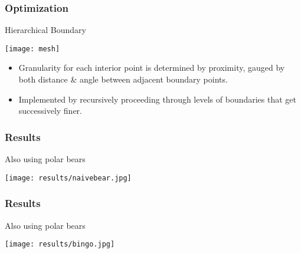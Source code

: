 \documentclass{beamer}
\theoremstyle{remark}
\begin{document}
\begin{frame}[t]
\frametitle{Optimization} 
\begin{block}{Hierarchical Boundary}
\pause
\begin{center}
\texttt{[image: mesh]}
\end{center}
\pause
\begin{itemize}
 \item \small{Granularity for each interior point is determined by proximity, gauged by both distance \& angle between adjacent boundary points.}
 \pause 
 \item \small{Implemented by recursively proceeding through levels of boundaries that get successively finer.}
\end{itemize}

\end{block}
\end{frame}


\begin{frame}[t]
 \frametitle{Results}
\begin{block}{Also using polar bears}
\pause
 \vspace{-2mm}
\begin{figure} 
\begin{center}
\end{center}
\end{figure}
\pause
\vspace{-20mm}
\begin{center}
 \texttt{[image: results/naivebear.jpg]}
\end{center}

\end{block}

\end{frame}

\begin{frame}[t]
 \frametitle{Results}
\begin{block}{Also using polar bears}
 \vspace{-2mm}
\begin{figure} 
\begin{center}
\end{center}
\end{figure}

\vspace{-20mm}
\begin{center}
 \texttt{[image: results/bingo.jpg]}
\end{center}

\end{block}

\end{frame}
\end{document}

